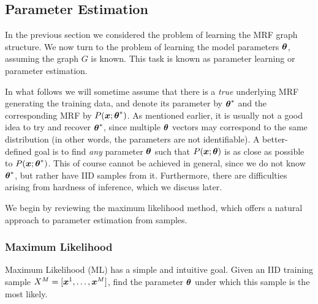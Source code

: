 \subsection{Parameter Estimation}
In the previous section we considered the problem of learning the MRF graph structure. We now turn to the problem of learning the model parameters $\boldsymbol{\theta}$, assuming the graph $G$ is known. This task is known as parameter learning or parameter estimation.

In what follows we will sometime assume that there is a {\em true} underlying MRF generating the training data, and denote its parameter by ${\boldsymbol{\theta}}^{*}$ and the corresponding MRF by $P(\boldsymbol{x}; {\boldsymbol{\theta}}^{*})$. As mentioned earlier, it is usually not a good idea to try and recover ${\boldsymbol{\theta}}^{*}$, since multiple $\boldsymbol{\theta}$ vectors may correspond to the same distribution (in other words, the parameters are not identifiable). A better-defined goal is to find {\em any} parameter $\boldsymbol{\theta}$ such that $P(\boldsymbol{x}; \boldsymbol{\theta})$ is as close as possible to $P(\boldsymbol{x}; {\boldsymbol{\theta}}^{*})$. This of course cannot be achieved in general, since we do not know ${\boldsymbol{\theta}}^{*}$,  but rather have IID samples from it. Furthermore, there are difficulties arising from hardness of inference, which we discuss later.

We begin by reviewing the maximum likelihood method, which offers a natural approach to parameter estimation from samples.




\subsubsection{Maximum Likelihood}
\label{sec:max_likelihood}
Maximum Likelihood (ML) has a simple and intuitive goal. Given an IID training sample  $X^M = [\boldsymbol{x}^1, \ldots, \boldsymbol{x}^{M}]$, find the parameter $\boldsymbol{\theta}$ under which 
this sample is the most likely. 


